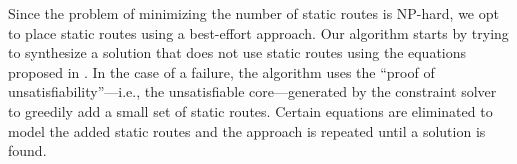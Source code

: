 Since the problem of minimizing the number of static routes
is NP-hard, we opt to place static routes using a best-effort approach.
Our algorithm starts by trying to synthesize a solution
that does not use static routes using the equations 
proposed in . 
In the case of a failure, the algorithm uses the ``proof of unsatisfiability''---i.e., the unsatisfiable core---generated by 
the constraint solver 
to greedily add a small set of static routes. 
Certain equations are eliminated 
to model the added static routes 
and the approach is repeated until a solution is found.


